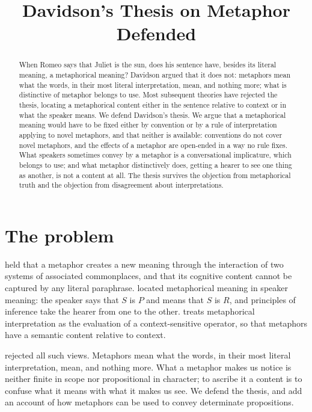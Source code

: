 \documentclass{situationist-preprint}
\title{Davidson's Thesis on Metaphor Defended}
\begin{document}
\maketitle

\begin{abstract}
When Romeo says that Juliet is the sun, does his sentence have, besides its literal meaning, a metaphorical meaning? Davidson argued that it does not: metaphors mean what the words, in their most literal interpretation, mean, and nothing more; what is distinctive of metaphor belongs to use. Most subsequent theories have rejected the thesis, locating a metaphorical content either in the sentence relative to context or in what the speaker means. We defend Davidson's thesis. We argue that a metaphorical meaning would have to be fixed either by convention or by a rule of interpretation applying to novel metaphors, and that neither is available: conventions do not cover novel metaphors, and the effects of a metaphor are open-ended in a way no rule fixes. What speakers sometimes convey by a metaphor is a conversational implicature, which belongs to use; and what metaphor distinctively does, getting a hearer to see one thing as another, is not a content at all. The thesis survives the objection from metaphorical truth and the objection from disagreement about interpretations.
\end{abstract}

\section{The problem}

\citet{Black1954} held that a metaphor creates a new meaning through the interaction of two systems of associated commonplaces, and that its cognitive content cannot be captured by any literal paraphrase. \citet{Searle1979} located metaphorical meaning in speaker meaning: the speaker says that $S$ is $P$ and means that $S$ is $R$, and principles of inference take the hearer from one to the other. \citet{Stern2000} treats metaphorical interpretation as the evaluation of a context-sensitive operator, so that metaphors have a semantic content relative to context.

\citet{Davidson1978} rejected all such views. Metaphors mean what the words, in their most literal interpretation, mean, and nothing more. What a metaphor makes us notice is neither finite in scope nor propositional in character; to ascribe it a content is to confuse what it means with what it makes us see. We defend the thesis, and add an account of how metaphors can be used to convey determinate propositions.
\end{document}
